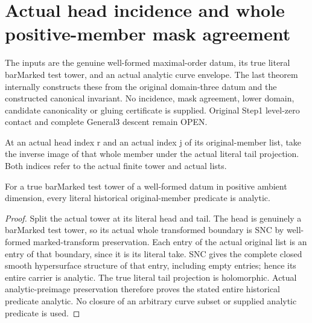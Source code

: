 \section{Actual head incidence and whole positive-member mask agreement}

The inputs are the genuine well-formed maximal-order datum, its true literal
barMarked test tower, and an actual analytic curve envelope. The last theorem
internally constructs these from the original domain-three datum and the
constructed canonical invariant. No incidence, mask agreement, lower domain,
candidate canonicality or gluing certificate is supplied. Original Step1
level-zero contact and complete General3 descent remain OPEN.

\begin{definition}
\label{hir:member-head-incidence-actual-predicate}
\leanok
{}
At an actual head index r and an actual index j of its original-member list,
take the inverse image of that whole member under the actual literal tail
projection. Both indices refer to the actual finite tower and actual lists.
\end{definition}

\begin{lemma}
\label{hir:member-head-incidence-actual-analytic}
\leanok
{}
For a true barMarked test tower of a well-formed datum in positive ambient
dimension, every literal historical original-member predicate is analytic.
\end{lemma}
\begin{proof}
Split the actual tower at its literal head and tail. The head is genuinely a
barMarked test tower, so its actual whole transformed boundary is SNC by
well-formed marked-transform preservation. Each entry of the actual original
list is an entry of that boundary, since it is its literal take. SNC gives
the complete closed smooth hypersurface structure of that entry, including
empty entries; hence its entire carrier is analytic. The true literal tail
projection is holomorphic. Actual analytic-preimage preservation therefore
proves the stated entire historical predicate analytic. No closure of an
arbitrary curve subset or supplied analytic predicate is used.
\end{proof}

